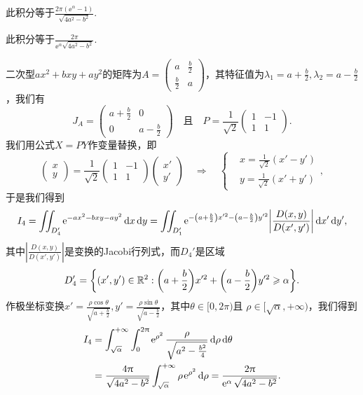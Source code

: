 \begin{solution}
\begin{inparaenum}[(a)]
    \item 此积分等于$\frac{2\pi(\ee^\alpha-1)}{\sqrt{4a^2-b^2}}$.

    \item 此积分等于$\frac{2\pi}{\ee^\alpha\sqrt{4a^2-b^2}}$.

    \item 二次型$ax^2+bxy+ay^2$的矩阵为$A=\begin{pmatrix}
          a & \frac b2 \\
          \frac b2 & a
        \end{pmatrix}$，其特征值为$\lambda_1=a+\frac b2,\lambda_2=a-\frac b2$，我们有
        \[
          J_A = \begin{pmatrix}
            a + \frac b2 & 0 \\
            0 & a - \frac b2
          \end{pmatrix} \quad \text{且} \quad
          P = \frac1{\sqrt2}
          \begin{pmatrix}
            1 & -1 \\
            1 & 1
          \end{pmatrix}.
        \]
    我们用公式$X=PY$作变量替换，即
    \[
      \begin{pmatrix}
        x \\
        y
      \end{pmatrix} =
      \frac1{\sqrt2}
      \begin{pmatrix}
            1 & -1 \\
            1 & 1
      \end{pmatrix}
      \begin{pmatrix}
        x' \\
        y'
      \end{pmatrix} \quad \Rightarrow \quad
      \left\{
        \begin{aligned}
          & x = \frac1{\sqrt2}(x' - y') \\
          & y = \frac1{\sqrt2}(x' + y')
        \end{aligned}
      \right.,
    \]
    于是我们得到
    \[
      I_4 = \iint_{D_4'} \ee^{-ax^2-bxy-ay^2} \dif x\dif y = \iint_{D_1'} \ee^{-\left(a+\frac b2 \right)x'^2-\left(a-\frac b2\right)y'^2}
      \left| \frac{D(x,y)}{D(x',y')} \right| \dif x'\dif y',
    \]
    其中$\left| \frac{D(x,y)}{D(x',y')} \right|$是变换的Jacobi行列式，而$D_4'$是区域
    \[
      D_4' = \left\{ (x',y')\in\MR^2: \left( a + \frac b2\right)x'^2 + \left( a - \frac b2 \right)y'^2 \ge \alpha \right\}.
    \]
    作极坐标变换$x'=\frac{\rho\cos\theta}{\sqrt{a+\frac b2}},y'=\frac{\rho\sin\theta}{\sqrt{a-\frac b2}}$，其中$\theta\in[0,2\pi)$且
    $\rho\in[\sqrt\alpha,+\infty)$，我们得到
    \begin{align*}
      I_4 & = \int_{\sqrt\alpha}^{+\infty}\int_0^{2\pi} \ee^{\rho^2} \frac{\rho}{\sqrt{a^2 - \frac{b^2}4}}\dif \rho\dif \theta \\
      & = \frac{4\pi}{\sqrt{4a^2-b^2}}
      \int_{\sqrt\alpha}^{+\infty}\rho\ee^{\rho^2} \dif \rho = \frac{2\pi}{\ee^\alpha\sqrt{4a^2-b^2}}.
    \end{align*}
  \end{inparaenum}
\end{solution}

